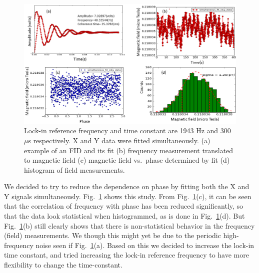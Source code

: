 \begin{figure}%
\centering\includegraphics[width=\linewidth]{figures/freq_1943_simultaneous_fit_300microsec_.png}
\caption{Lock-in reference frequency and time constant are 1943 Hz and
  300~$\mu$s respectively.  X and Y data were fitted simultaneously.
  (a) example of an FID and its fit (b) frequency measurement
  translated to magnetic field (c) magnetic field vs.~phase determined
  by fit (d) histogram of field
  measurements.\label{fig:freq_1943_simultaneous_fit_300_micro_sec}}
\end{figure}

We decided to try to reduce the dependence on phase by fitting both
the X and Y signals simultaneously.
Fig.~\ref{fig:freq_1943_simultaneous_fit_300_micro_sec} shows this
study.  From
Fig.~\ref{fig:freq_1943_simultaneous_fit_300_micro_sec}(c), it can be
seen that the correlation of frequency with phase has been reduced
significantly, so that the data look statistical when histogrammed, as
is done in Fig.~\ref{fig:freq_1943_simultaneous_fit_300_micro_sec}(d).
But Fig.~\ref{fig:freq_1943_simultaneous_fit_300_micro_sec}(b) still
clearly shows that there is non-statistical behavior in the frequency
(field) measurements.  We though this might yet be due to the periodic
high-frequency noise seen if
Fig.~\ref{fig:freq_1943_simultaneous_fit_300_micro_sec}(a).  Based on
this we decided to increase the lock-in time constant, and tried
increasing the lock-in reference frequency to have more flexibility to
change the time-constant.

